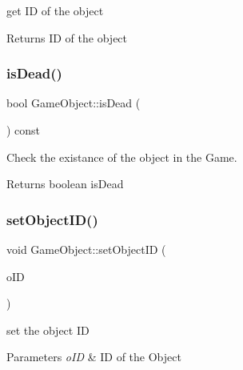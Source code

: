 get ID of the object 

\begin{DoxyReturn}{Returns}
ID of the object 
\end{DoxyReturn}
\mbox{\label{class_game_object_a4a33322fbd4fe9d0d99b56ce872f7d4b}} 
\subsubsection{\texorpdfstring{is\+Dead()}{isDead()}}
{\footnotesize\ttfamily bool Game\+Object\+::is\+Dead (\begin{DoxyParamCaption}{ }\end{DoxyParamCaption}) const\hspace{0.3cm}{\ttfamily [inline]}}



Check the existance of the object in the Game. 

\begin{DoxyReturn}{Returns}
boolean is\+Dead 
\end{DoxyReturn}
\mbox{\label{class_game_object_a2ba7a56d4fa8a002fb150989287d6b43}} 
\subsubsection{\texorpdfstring{set\+Object\+I\+D()}{setObjectID()}}
{\footnotesize\ttfamily void Game\+Object\+::set\+Object\+ID (\begin{DoxyParamCaption}\item[{Object\+ID}]{o\+ID }\end{DoxyParamCaption})\hspace{0.3cm}{\ttfamily [inline]}}



set the object ID 


\begin{DoxyParams}{Parameters}
{\em o\+ID} & ID of the Object \\
\hline
\end{DoxyParams}
\mbox{\label{class_game_object_aa8b57a053c1fee8d3d14912dd9e320c8}} 
